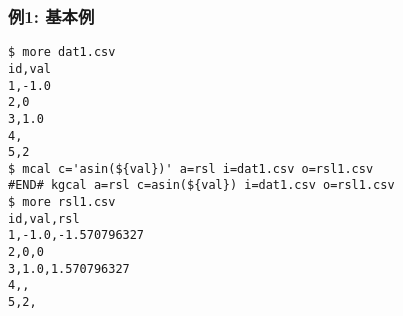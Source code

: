 \subsubsection*{例1: 基本例}



\begin{Verbatim}[baselinestretch=0.7,frame=single]
$ more dat1.csv
id,val
1,-1.0
2,0
3,1.0
4,
5,2
$ mcal c='asin(${val})' a=rsl i=dat1.csv o=rsl1.csv
#END# kgcal a=rsl c=asin(${val}) i=dat1.csv o=rsl1.csv
$ more rsl1.csv
id,val,rsl
1,-1.0,-1.570796327
2,0,0
3,1.0,1.570796327
4,,
5,2,
\end{Verbatim}
